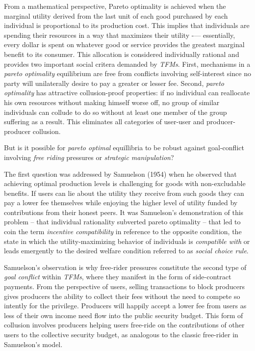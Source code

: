 \documentclass[sigconf,anonymous]{aamas}
\begin{document}
From a mathematical perspective, Pareto optimality is achieved when the marginal utility derived from the last unit of each good purchased by each individual is proportional to its production cost. This implies that individuals are spending their resources in a way that maximizes their utility -— essentially, every dollar is spent on whatever good or service provides the greatest marginal benefit to its consumer. This allocation is considered individually rational and provides two important social critera demanded by \textit{TFMs}. First, mechanisms in a \textit{pareto optimality} equilibrium are free from conflicts involving self-interest since no party will unilaterally desire to pay a greater or lesser fee. Second, \textit{pareto optimality} has attractive collusion-proof properties: if no individual can reallocate his own resources without making himself worse off, no group of similar individuals can collude to do so without at least one member of the group suffering as a result. This eliminates all categories of user-user and producer-producer collusion.

But is it possible for \textit{pareto optimal} equillibria to be robust against goal-conflict involving \textit{free riding} pressures or \textit{strategic manipulation}?

The first question was addressed by Samuelson (1954) when he observed that achieving optimal production levels is challenging for goods with non-excludable benefits. If users can lie about the utility they receive from such goods they can pay a lower fee themselves while enjoying the higher level of utility funded by contributions from their honest peers. It was Samuelson's demonstration of this problem -- that individual rationality subverted pareto optimality -- that led \citet{hurwicz1960optimality} to coin the term \textit{incentive compatibility} in reference to the opposite condition, the state in which the utility-maximizing behavior of individuals is \textit{compatible with} or leads emergently to the desired welfare condition referred to as \textit{social choice rule}.

Samuelson's observation is why free-rider pressures constitute the second type of \textit{goal conflict} within \textit{TFMs}, where they manifest in the form of side-contract payments. From the perspective of users, selling transactions to block producers gives producers the ability to collect their fees without the need to compete so intently for the privilege. Producers will happily accept a lower fee from users as less of their own income need flow into the public security budget. This form of collusion involves producers helping users free-ride on the contributions of other users to the collective security budget, as analogous to the classic free-rider in Samuelson's model.
\end{document}
